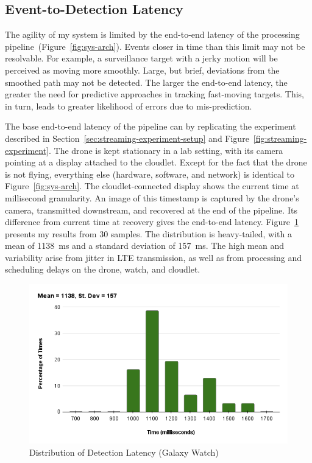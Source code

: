 \subsection{Event-to-Detection Latency}
\label{sec:e2elatency}

The agility of my system is limited by the end-to-end latency of the
processing pipeline~(Figure~\ref{fig:sys-arch}).  Events closer in
time than this limit may not be resolvable.  For example, a
surveillance target with a jerky motion will be perceived as moving
more smoothly.  Large, but brief, deviations from the smoothed path
may not be detected.  The larger the end-to-end latency, the greater
the need for predictive approaches in tracking fast-moving
targets.  This, in turn, leads to greater likelihood of errors due
to mis-prediction.

The base end-to-end latency of the pipeline can by replicating the experiment described in Section~\ref{sec:streaming-experiment-setup} and Figure~\ref{fig:streaming-experiment}. The
drone is kept stationary in a lab setting, with its camera pointing at a display attached to the cloudlet. Except
for the fact that the drone is not flying, everything else (hardware, software, and network) is identical to Figure~\ref{fig:sys-arch}.  The cloudlet-connected display shows the current time at millisecond
granularity.  An image of this timestamp is captured by the drone's camera, transmitted downstream, and recovered at the end of the pipeline.  Its difference from current time at recovery gives the end-to-end latency.  Figure~\ref{fig:e2elatency} presents my results from 30 samples. The distribution is heavy-tailed, with a mean of 1138~ms and a standard deviation of 157~ms.  The high mean and variability arise from jitter in LTE transmission, as well as from processing and scheduling delays on the drone, watch, and cloudlet.


\begin{figure}
\centering
\includegraphics[width=0.7\linewidth]{chapter4/FIGS/new_mtp_watch.png}
\caption{Distribution of Detection Latency (Galaxy Watch)}
\label{fig:e2elatency}
\end{figure}


